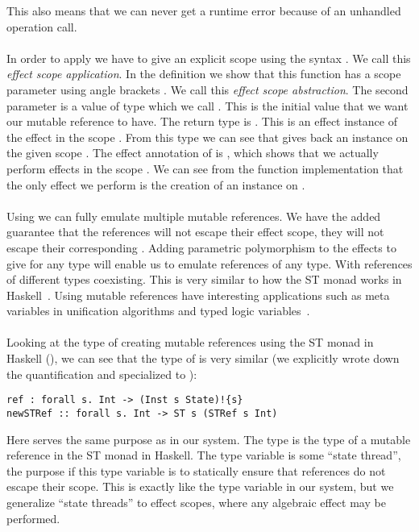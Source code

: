 This also means that we can never get a runtime error because of an unhandled operation call.
\\\\
In order to apply  we have to give an explicit scope  using the syntax .
We call this \emph{effect scope application}.
In the definition we show that this function has a scope parameter using angle brackets \ident{[s]}.
We call this \emph{effect scope abstraction}.
The second parameter is a value of type  which we call .
This is the initial value that we want our mutable reference to have.
The return type is .
This is an effect instance of the  effect in the scope .
From this type we can see that  gives back an instance on the given scope .
The effect annotation of  is , which shows that we actually perform effects in the scope .
We can see from the function implementation that the only effect we perform is the creation of an instance on .
\\\\
Using  we can fully emulate multiple mutable references.
We have the added guarantee that the references will not escape their effect scope, they will not escape their corresponding .
Adding parametric polymorphism to the effects to give  for any type  will enable us to emulate references of any type.
With references of different types coexisting.
This is very similar to how the ST monad works in Haskell~\autocite{runst}.
Using mutable references have interesting applications such as meta variables in unification algorithms and typed logic variables~\autocite{typedlogic}.
\\\\
Looking at the type of creating mutable references using the ST monad in Haskell (), we can see that the type of  is very similar
(we explicitly wrote down the quantification and specialized  to ):

\begin{verbatim}
ref : forall s. Int -> (Inst s State)!{s}
newSTRef :: forall s. Int -> ST s (STRef s Int)
\end{verbatim}

Here  serves the same purpose as  in our system.
The type  is the type of a mutable reference in the ST monad in Haskell.
The type variable  is some ``state thread'', the purpose if this type variable is to statically ensure that references do not escape their scope.
This is exactly like the  type variable in our system, but we generalize ``state threads'' to effect scopes, where any algebraic effect may be performed.

